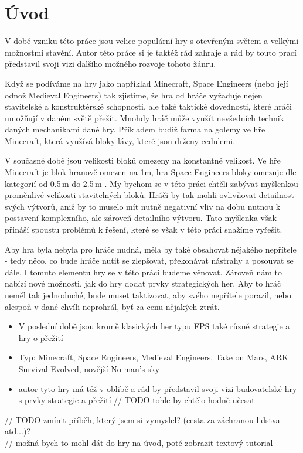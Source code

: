 
\chapter*{Úvod}

V době vzniku této práce jsou velice populární hry s otevřeným světem a velkými možnostmi stavění. Autor této práce si je taktéž rád zahraje a rád by touto prací představil svoji vizi dalšího možného rozvoje tohoto žánru.

Když se podíváme na hry jako například Minecraft, Space Engineers (nebo její odnož Medieval Engineers) tak zjistíme, že hra od hráče vyžaduje nejen stavitelské a konstruktérské schopnosti, ale také taktické dovednosti, které hráči umožňují v daném světě přežít. Mnohdy hráč může využít nevšedních technik daných mechanikami dané hry. Příkladem budiž farma na golemy ve hře Minecraft, která využívá bloky lávy, které jsou drženy cedulemi\citep{minecraft_tut_farm}.

V současné době jsou velikosti bloků omezeny na konstantné velikost. Ve hře Minecraft je blok hranově omezen na 1m, hra Space Engineers bloky omezuje dle kategorií od 0.5\,\rm m do 2.5\,\rm m \citep{se_blocks_wiki}.
My bychom se v této práci chtěli zabývat myšlenkou proměnlivé velikosti stavitelných bloků. Hráči by tak mohli ovlivňovat detailnost svých výtvorů, aniž by to muselo mít nutně negativní vliv na dobu nutnou k postavení komplexního, ale zároveň detailního výtvoru. Tato myšlenka však přináší spoustu problémů k řešení, které se však v této práci snažíme vyřešit.

Aby hra byla nebyla pro hráče nudná, měla by také obsahovat nějakého nepřítele - tedy něco, co bude hráče nutit se zlepšovat, překonávat nástrahy a posouvat se dále. I tomuto elementu hry se v této práci budeme věnovat. Zároveň nám to nabízí nové možnosti, jak do hry dodat prvky strategických her. Aby to hráč neměl tak jednoduché, bude muset taktizovat, aby svého nepřítele porazil, nebo alespoň v dané chvíli neprohrál, byť za cenu nějakých ztrát.

\begin{itemize}
	\item V poslední době jsou kromě klasických her typu FPS také různé strategie a hry o přežití
	\item Typ: Minecraft, Space Engineers, Medieval Engineers, Take on Mars, ARK Survival Evolved, novější No man's sky
	\item autor tyto hry má též v oblibě a rád by představil svoji vizi budovatelské hry s prvky strategie a přežití		// TODO tohle by chtělo hodně učesat
\end{itemize}		

// TODO zmínit příběh, který jsem si vymyslel? (cesta za záchranou lidstva atd...)? \\

// možná bych to mohl dát do hry na úvod, poté zobrazit textový tutorial